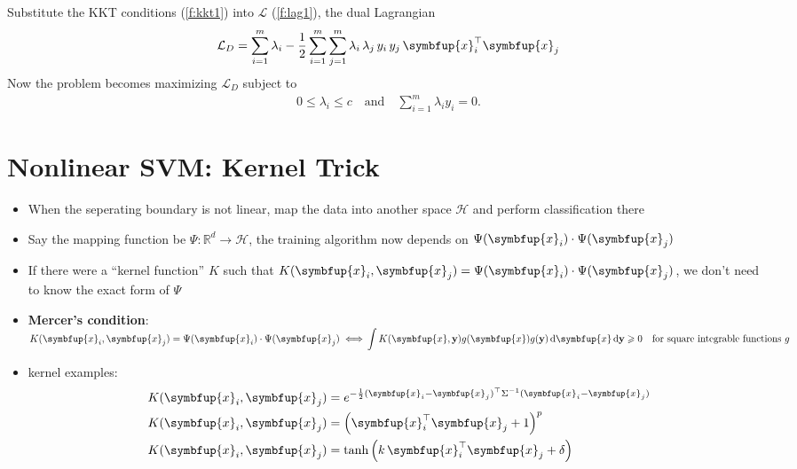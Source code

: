 \documentclass[11pt]{extarticle}
\newcommand{\ds}{\displaystyle}
\newcommand{\ifff}{\;\Longleftrightarrow\;}
\newcommand{\vx}{\symbfup{x}}
\theoremstyle{definition}
\begin{document}
\endgroup
Substitute the KKT conditions (\ref{f:kkt1}) into $\mathcal{L}$ (\ref{f:lag1}), the dual Lagrangian 
\vspace{-1mm}
\begin{align*}
  \mathcal{L}_D=\sum_{i=1}^m\lambda_i-\frac{1}{2}\sum_{i=1}^m\sum_{j=1}^m\lambda_i\,\lambda_j\,y_i\,y_j\,\vx_i^\top\vx_j
\end{align*}
Now the problem becomes maximizing $\mathcal{L}_D$ subject to
\vspace{-1mm}
\begin{align*}
  0\leqslant\lambda_i\leqslant c\quad\text{and}\quad\sum_{i=1}^m\lambda_i y_i = 0.
\end{align*}

\newpage

\section*{Nonlinear SVM: Kernel Trick}
\begin{itemize}
  \item When the seperating boundary is not linear, map the data into another space $\mathcal{H}$ and perform classification there 
  \item Say the mapping function be $\Psi:\mathbb{R}^d\to\mathcal{H}$, the training algorithm now depends on $\Psi(\vx_i)\cdot\Psi(\vx_j)$ 
  \item If there were a ``kernel function'' $K$ such that $\ds K(\vx_i,\vx_j)=\Psi(\vx_i)\cdot\Psi(\vx_j)$, we don't need to know the exact form of $\Psi$
  \item \textbf{Mercer's condition}: $\ds K(\vx_i,\vx_j)=\Psi(\vx_i)\cdot\Psi(\vx_j) \ifff \\ \int K(\vx,{\bf y})g(\vx)g({\bf y})\,\text{d}\vx\,\text{d}{\bf y}\geqslant 0\quad\text{for square integrable functions }g$
  \item kernel examples:
    \begingroup
    \addtolength{\jot}{-2pt}
    \begin{align*}
      K(\vx_i,\vx_j)&=e^{-\frac{1}{2}(\vx_i-\vx_j)^\top\Sigma^{-1}(\vx_i-\vx_j)}\\
      K(\vx_i,\vx_j)&=\left(\vx_i^\top\vx_j + 1\right)^p \\
      K(\vx_i,\vx_j)&=\tanh\left(k\,\vx_i^\top\vx_j + \delta\right)
    \end{align*}
    \endgroup
\end{itemize}



\end{document}
